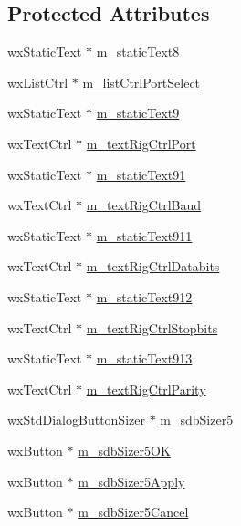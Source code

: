 \subsection*{Protected Attributes}
\begin{DoxyCompactItemize}
\item 
wx\-Static\-Text $\ast$ \hyperlink{class_dlg_com_ports_af0cbd9e67bbede8e5b1d4ef2941d4ad6}{m\-\_\-static\-Text8}
\item 
wx\-List\-Ctrl $\ast$ \hyperlink{class_dlg_com_ports_a79fa4831dbf5e4aa13f239c23d1ca9a8}{m\-\_\-list\-Ctrl\-Port\-Select}
\item 
wx\-Static\-Text $\ast$ \hyperlink{class_dlg_com_ports_ae20ae58413be1c7932f9d83f37ccfe3e}{m\-\_\-static\-Text9}
\item 
wx\-Text\-Ctrl $\ast$ \hyperlink{class_dlg_com_ports_ac9be845d35a7303c5ac404e892f10ffb}{m\-\_\-text\-Rig\-Ctrl\-Port}
\item 
wx\-Static\-Text $\ast$ \hyperlink{class_dlg_com_ports_a4767f6424f77abf870d2c90dc7a47a9b}{m\-\_\-static\-Text91}
\item 
wx\-Text\-Ctrl $\ast$ \hyperlink{class_dlg_com_ports_a3ce4c208d87405f7c4242819339039d8}{m\-\_\-text\-Rig\-Ctrl\-Baud}
\item 
wx\-Static\-Text $\ast$ \hyperlink{class_dlg_com_ports_a7a45e6c9f89fa6595fe30611d3240760}{m\-\_\-static\-Text911}
\item 
wx\-Text\-Ctrl $\ast$ \hyperlink{class_dlg_com_ports_a480454f649f9bc72afbf42c5e9521e3b}{m\-\_\-text\-Rig\-Ctrl\-Databits}
\item 
wx\-Static\-Text $\ast$ \hyperlink{class_dlg_com_ports_a49c213a919a1aff50754fad11b67a44d}{m\-\_\-static\-Text912}
\item 
wx\-Text\-Ctrl $\ast$ \hyperlink{class_dlg_com_ports_a1bf803269da16b3f56c2c5bd21ba484b}{m\-\_\-text\-Rig\-Ctrl\-Stopbits}
\item 
wx\-Static\-Text $\ast$ \hyperlink{class_dlg_com_ports_a4feeee0f9422f971e0ae0abd6a6ef68c}{m\-\_\-static\-Text913}
\item 
wx\-Text\-Ctrl $\ast$ \hyperlink{class_dlg_com_ports_a807f268b9b09eece038789b3b57eda1c}{m\-\_\-text\-Rig\-Ctrl\-Parity}
\item 
wx\-Std\-Dialog\-Button\-Sizer $\ast$ \hyperlink{class_dlg_com_ports_ace2a43e0c378c7c1e032d10ba7f082d5}{m\-\_\-sdb\-Sizer5}
\item 
wx\-Button $\ast$ \hyperlink{class_dlg_com_ports_a2ff33e71acd9d244306526c9e1c914f8}{m\-\_\-sdb\-Sizer5\-O\-K}
\item 
wx\-Button $\ast$ \hyperlink{class_dlg_com_ports_a370f3c0a292163cfc65c09f85be962f7}{m\-\_\-sdb\-Sizer5\-Apply}
\item 
wx\-Button $\ast$ \hyperlink{class_dlg_com_ports_abad0ef2595c613184b545ecd91b994d9}{m\-\_\-sdb\-Sizer5\-Cancel}
\end{DoxyCompactItemize}


